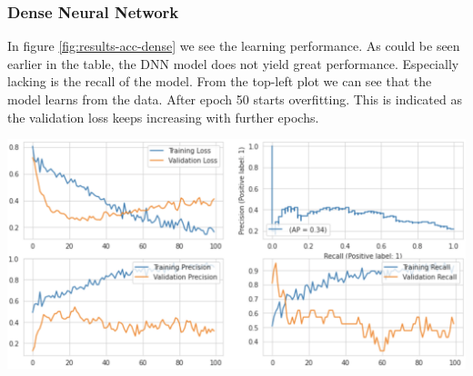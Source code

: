 \begin{minipage}{\textwidth}
\subsubsection{Dense Neural Network}

In figure \ref{fig:results-acc-dense} we see the learning performance. As could be seen earlier in the table, the DNN model does not yield great performance. Especially lacking is the recall of the model. From the top-left plot we can see that the model learns from the data. After epoch 50 starts overfitting. This is indicated as the validation loss keeps increasing with further epochs.
\baselineskip

\begin{center}
\includegraphics[width=.75\textwidth,keepaspectratio]{images/6_results/results-acc-dense.png}
\end{center}
\captionsetup{width=.90\textwidth}
\label{fig:results-acc-dense}
\baselineskip
\end{minipage}

